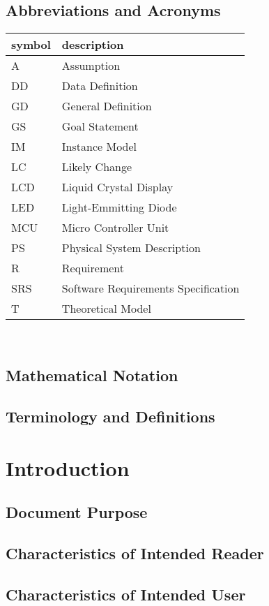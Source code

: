 \documentclass[12pt]{article}
\begin{document}
\newpage

\subsection{Abbreviations and Acronyms}
\begin{tabular}{l l} 
  \toprule		
  \textbf{symbol} & \textbf{description}\\
  \midrule 
  A & Assumption\\
  DD & Data Definition\\
  GD & General Definition\\
  GS & Goal Statement\\
  IM & Instance Model\\
  LC & Likely Change\\
  LCD & Liquid Crystal Display\\
  LED & Light-Emmitting Diode\\
  MCU & Micro Controller Unit\\
  PS & Physical System Description\\
  R & Requirement\\
  SRS & Software Requirements Specification\\
  T & Theoretical Model\\
  \bottomrule
\end{tabular}\\

\subsection{Mathematical Notation}

\subsection{Terminology and  Definitions}

\section{Introduction}
\subsection{Document Purpose}
\subsection{Characteristics of Intended Reader}
\subsection{Characteristics of Intended User}
\end{document}
